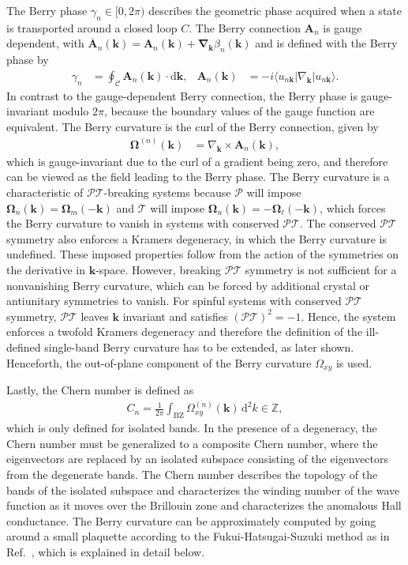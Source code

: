 The Berry phase $\gamma_n \in [0,2\pi)$ describes the geometric phase acquired when a state is transported around a closed loop $C$. The Berry connection $\mathbf{A}_n$ is gauge dependent, with $\overline{\mathbf{A}}_n (\mathbf{k}) = \mathbf{A}_n(\mathbf{k}) + \bm{\nabla}_{\mathbf{k}}\beta_n(\mathbf{k})$ and is defined with the Berry phase by
 \begin{align}
\gamma_n
&=
\oint_{\mathcal C}
\mathbf A_n(\mathbf k)\cdot \text{d}\mathbf k,
&
\mathbf A_n(\mathbf k)
&=
-i\langle u_{n\mathbf k}|\nabla_{\mathbf k}|u_{n\mathbf k}\rangle .
\label{eq: Berry phase}
\end{align}
In contrast to the gauge-dependent Berry connection, the Berry phase is gauge-invariant modulo $2\pi$, because the boundary values of the gauge function are equivalent. 
The Berry curvature is the curl of the Berry connection, given by
\begin{align}
\bm{\Omega}^{(n)}(\mathbf k)
&=
\nabla_{\mathbf k}\times \mathbf A_n(\mathbf k),
\end{align}
which is gauge-invariant due to the curl of a gradient being zero, and therefore can be viewed as the field leading to the Berry phase.
The Berry curvature is a characteristic of $\mathcal{PT}$-breaking systems because $\mathcal{P}$ will impose $\bm{\Omega}_n(\mathbf{k}) =\bm{\Omega}_m(-\mathbf{k})$ and $\mathcal{T}$ will impose $\bm{\Omega}_n(\mathbf{k}) =-\bm{\Omega}_\ell(-\mathbf{k})$, which forces the Berry curvature to vanish in systems with conserved $\mathcal{PT}$. The conserved $\mathcal{PT}$ symmetry also enforces a Kramers degeneracy, in which the Berry curvature is undefined. 
These imposed properties follow from the action of the symmetries on the derivative in $\mathbf{k}$-space.
However, breaking $\mathcal{PT}$ symmetry is not sufficient for a nonvanishing Berry curvature, which can be forced by additional crystal or antiunitary symmetries to vanish.
For spinful systems with conserved $\mathcal{PT}$ symmetry, $
  \mathcal{PT}$ leaves
  $\mathbf{k}$ invariant and satisfies $(\mathcal{PT})^2=-1$. Hence, the system enforces a twofold Kramers degeneracy and therefore the definition of the ill-defined single-band Berry curvature has to be extended, as later shown. 
Henceforth, the out-of-plane component of the Berry curvature $\Omega_{xy}$ is used.

Lastly, the Chern number is defined as
\begin{align}
C_n = \frac{1}{2\pi}
\int_{\mathrm{BZ}}
\Omega^{(n)}_{xy}(\mathbf k)\,\text{d}^2k
\in \mathbb Z,
\label{eq: Chern number}
\end{align}
which is only defined for isolated bands. In the presence of a degeneracy, the Chern number must be generalized to a composite Chern number, where the eigenvectors are replaced by an isolated subspace consisting of the eigenvectors from the degenerate bands. The Chern number describes the topology of the bands of the isolated subspace and characterizes the winding number of the wave function as it moves over the Brillouin zone and characterizes the anomalous Hall conductance. The Berry curvature can be approximately computed by going around a small plaquette according to the Fukui-Hatsugai-Suzuki method as in  Ref.~\cite{Fukui_2005}, which is explained in detail below.

